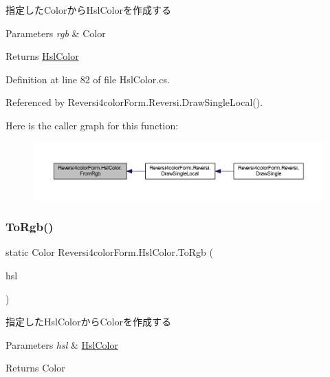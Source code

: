 指定した\+Colorから\+Hsl\+Colorを作成する 


\begin{DoxyParams}{Parameters}
{\em rgb} & Color\\
\hline
\end{DoxyParams}
\begin{DoxyReturn}{Returns}
\hyperlink{class_reversi4color_form_1_1_hsl_color}{Hsl\+Color}
\end{DoxyReturn}


Definition at line 82 of file Hsl\+Color.\+cs.



Referenced by Reversi4color\+Form.\+Reversi.\+Draw\+Single\+Local().

Here is the caller graph for this function\+:\nopagebreak
\begin{figure}[H]
\begin{center}
\leavevmode
\includegraphics[width=350pt]{class_reversi4color_form_1_1_hsl_color_ae9adbbe822f39c29ef11839c80923718_icgraph}
\end{center}
\end{figure}
\mbox{\label{class_reversi4color_form_1_1_hsl_color_adc8d6bd6fd29eff44ccc1f2d1890fd72}} 
\subsubsection{\texorpdfstring{To\+Rgb()}{ToRgb()}}
{\footnotesize\ttfamily static Color Reversi4color\+Form.\+Hsl\+Color.\+To\+Rgb (\begin{DoxyParamCaption}\item[{\hyperlink{class_reversi4color_form_1_1_hsl_color}{Hsl\+Color}}]{hsl }\end{DoxyParamCaption})\hspace{0.3cm}{\ttfamily [static]}}



指定した\+Hsl\+Colorから\+Colorを作成する 


\begin{DoxyParams}{Parameters}
{\em hsl} & \hyperlink{class_reversi4color_form_1_1_hsl_color}{Hsl\+Color}\\
\hline
\end{DoxyParams}
\begin{DoxyReturn}{Returns}
Color
\end{DoxyReturn}


